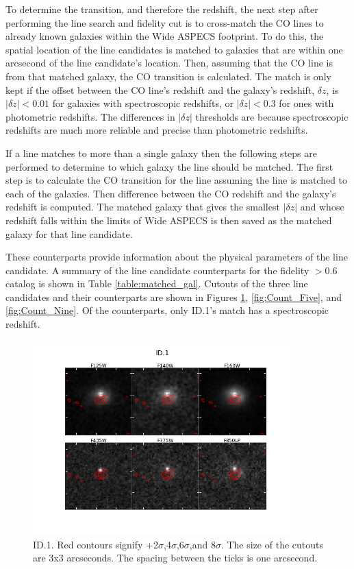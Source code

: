 To determine the transition, and therefore the redshift, the next step after performing the line search and fidelity cut is to cross-match the CO lines to already known galaxies within the Wide ASPECS footprint. To do this, the spatial location of the line candidates is matched to galaxies that are within one arcsecond of the line candidate's location. Then, assuming that the CO line is from that matched galaxy, the CO transition is calculated. The match is only kept if the offset between the CO line's redshift and the galaxy's redshift, $\delta z$, is $|\delta z| < 0.01$ for galaxies with spectroscopic redshifts, or $|\delta z| < 0.3$ for ones with photometric redshifts. The differences in $|\delta z|$ thresholds are because spectroscopic redshifts are much more reliable and precise than photometric redshifts. 

If a line matches to more than a single galaxy then the following steps are performed to determine to which galaxy the line should be matched. The first step is to calculate the CO transition for the line assuming the line is matched to each of the galaxies. Then difference between the CO redshift and the galaxy's redshift is computed. The matched galaxy that gives the smallest $|\delta z|$ and whose redshift falls within the limits of Wide ASPECS is then saved as the matched galaxy for that line candidate. 

These counterparts provide information about the physical parameters of the line candidate. A summary of the line candidate counterparts for the fidelity $>$0.6 catalog is shown in Table \ref{table:matched_gal}. Cutouts of the three line candidates and their counterparts are shown in Figures \ref{fig:Count_One}, \ref{fig:Count_Five}, and \ref{fig:Count_Nine}. Of the counterparts, only ID.1's match has a spectroscopic redshift.

\begin{figure}[!htbp]
\centering \includegraphics[width=100mm]{Matched/ASPECS_Cutout_0.png}
\caption{ID.1. Red contours signify +2$\sigma$,4$\sigma$,6$\sigma$,and 8$\sigma$. The size of the cutouts are 3x3 arcseconds. The spacing between the ticks is one arcsecond.}
\label{fig:Count_One}
\end{figure}

